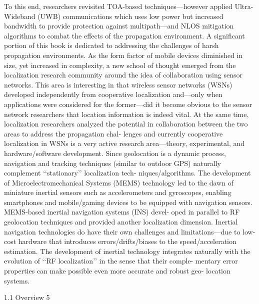 To this end, researchers revisited TOA-based techniques—however applied Ultra-
Wideband (UWB) communications which uses low power but increased bandwidth
to provide protection against multipath—and NLOS mitigation algorithms to
combat the effects of the propagation environment. A significant portion of this book
is dedicated to addressing the challenges of harsh propagation environments.
As the form factor of mobile devices diminished in size, yet increased in
complexity, a new school of thought emerged from the localization research
community around the idea of collaboration using sensor networks. This area is
interesting in that wireless sensor networks (WSNs) developed independently from
cooperative localization and—only when applications were considered for the
former—did it become obvious to the sensor network researchers that location
information is indeed vital. At the same time, localization researchers analyzed the
potential in collaboration between the two areas to address the propagation chal-
lenges and currently cooperative localization in WSNs is a very active research
area—theory, experimental, and hardware/software development.
Since geolocation is a dynamic process, navigation and tracking techniques
(similar to outdoor GPS) naturally complement ‘‘stationary’’ localization tech-
niques/algorithms. The development of Microelectromechanical Systems (MEMS)
technology led to the dawn of miniature inertial sensors such as accelerometers
and gyroscopes, enabling smartphones and mobile/gaming devices to be equipped
with navigation sensors. MEMS-based inertial navigation systems (INS) devel-
oped in parallel to RF geolocation techniques and provided another localization
dimension. Inertial navigation technologies do have their own challenges and
limitations—due to low-cost hardware that introduces errors/drifts/biases to the
speed/acceleration estimation. The development of inertial technology integrates
naturally with the evolution of ‘‘RF localization’’ in the sense that their comple-
mentary error properties can make possible even more accurate and robust geo-
location systems.

1.1 Overview 5


